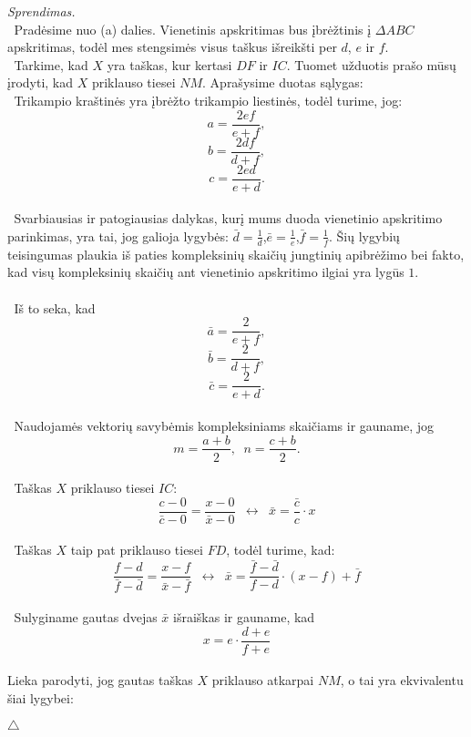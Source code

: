 \documentclass[11pt,a4paper,twoside]{book}
\newenvironment{sprendimas}{\noindent \textit{Sprendimas.}}{\hfill $\triangle$}
\theoremstyle{definition} \newtheorem*{api}{Apibrėžimas}
\theoremstyle{remark} \newtheorem*{pastaba}{Pastaba}
\begin{document}
\begin{sprendimas}
\\$\phantom{a}$Pradėsime nuo (a) dalies. Vienetinis apskritimas bus įbrėžtinis į $\Delta ABC$ apskritimas, todėl mes stengsimės visus taškus išreikšti per $d$, $e$ ir $f$.
\\  $\phantom{a}$Tarkime, kad $X$ yra taškas, kur kertasi $DF$ ir $IC$. Tuomet užduotis prašo mūsų įrodyti, kad $X$ priklauso tiesei $NM$.
        Aprašysime duotas sąlygas:
            \\$\phantom{a}$Trikampio kraštinės yra įbrėžto trikampio liestinės, todėl turime, jog:
                    $$ a =\frac{2ef}{e+f},$$
                     $$ b=\frac{2df}{d+f},$$
                    $$ c=\frac{2ed}{e+d}.$$
            \\ $\phantom{a}$Svarbiausias ir patogiausias dalykas, kurį mums duoda vienetinio apskritimo parinkimas, yra tai, jog
            galioja lygybės: $\bar{d}= \frac{1}{d}$,$\bar{e}= \frac{1}{e}$,$\bar{f}= \frac{1}{f}$. Šių 
            lygybių teisingumas plaukia iš paties kompleksinių skaičių jungtinių apibrėžimo bei fakto, kad visų kompleksinių 
            skaičių ant vienetinio apskritimo ilgiai yra lygūs $1$.\\
            \\ $\phantom{a}$Iš to seka, kad 
                  $$ \bar a =\frac{2}{e+f},$$
                  $$ \bar b=\frac{2}{d+f},$$
                  $$ \bar c=\frac{2}{e+d}.$$
           \\$\phantom{a}$Naudojamės vektorių savybėmis kompleksiniams skaičiams ir gauname, jog
                  $$ m=\frac{a+b}{2}, \phantom{a} n=\frac{c+b}{2}.$$
            \\$\phantom{a}$Taškas $X$ priklauso tiesei $IC$:
                     $$ \frac{c-0}{\bar{c}-0}=\frac{x-0}{\bar{x} - 0} {\phantom{a}}\leftrightarrow \phantom{a} \bar{x}= \frac{\bar{c}}{c}\cdot  x $$ 
           \\ $\phantom{a}$Taškas $X$ taip pat priklauso tiesei $FD$, todėl turime, kad:
                  \\ $$\frac{f-d}{\bar{f}-\bar{d}}=\frac{x-f}{\bar{x} - \bar{f}}  {\phantom{a}}\leftrightarrow \phantom{a} \bar{x}= \frac{ \bar{f} - \bar{d} }{f-d}\cdot  (x-f)+\bar{f} $$
      \\$\phantom{a}$Sulyginame gautas dvejas $\bar{x}$ išraiškas ir gauname, kad 
                   $$ x = e \cdot \frac{d+e}{f+e}$$
      \\Lieka parodyti, jog gautas taškas $X$ priklauso atkarpai $NM$, o tai yra ekvivalentu šiai lygybei:

\end{sprendimas}
\end{document}

